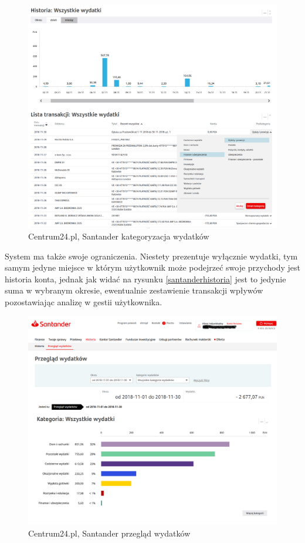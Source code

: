 \documentclass[a4paper,10pt, twoside]{report}
\begin{document}
\begin{large}
\begin{figure}[H]
    \includegraphics[width=12cm]{figures/Santander_PrzegladWydatkow_kategoryzacja.png}
    \caption{Centrum24.pl, Santander kategoryzacja wydatków}
    \label{fig:santanderkategoryzacja}
\end{figure}

{System ma także swoje ograniczenia. Niestety prezentuje wyłącznie wydatki, tym 
samym jedyne miejsce w którym użytkownik może podejrzeć swoje przychody jest 
historia konta, jednak jak widać na rysunku \ref{santanderhistoria} jest to 
jedynie suma w wybranym okresie, ewentualnie zestawienie transakcji wpływów 
pozostawiając analizę w gestii użytkownika.}

\begin{figure}[H]           %
    \centering
    \includegraphics[width=12cm]{figures/Santander_PrzegladWydatkow_przeglad.png}
    \caption{Centrum24.pl, Santander przegląd wydatków}
    \label{fig:santanderprzeglad}
\end{figure}


\end{large}
\end{document}
